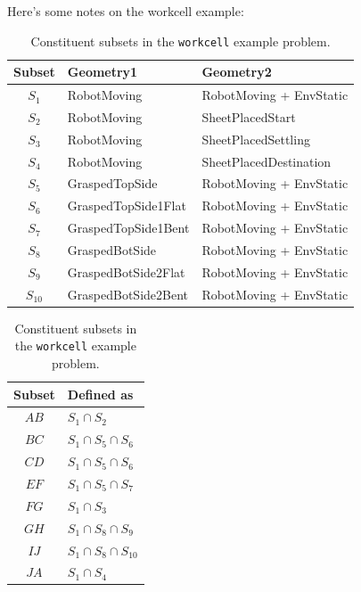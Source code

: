 Here's some notes on the workcell example:

\begin{table}
   \centering
   \begin{minipage}[t]{.65\textwidth}
   \begin{tabular}{cll}
      \toprule
      Subset & Geometry1 & Geometry2 \\
      \midrule
      $S_1$  & RobotMoving & RobotMoving + EnvStatic \\
      $S_2$  & RobotMoving & SheetPlacedStart \\
      $S_3$  & RobotMoving & SheetPlacedSettling \\
      $S_4$  & RobotMoving & SheetPlacedDestination \\
      $S_5$  & GraspedTopSide & RobotMoving + EnvStatic \\
      $S_6$  & GraspedTopSide1Flat & RobotMoving + EnvStatic \\
      $S_7$  & GraspedTopSide1Bent & RobotMoving + EnvStatic \\
      $S_8$  & GraspedBotSide & RobotMoving + EnvStatic \\
      $S_9$  & GraspedBotSide2Flat & RobotMoving + EnvStatic \\
      $S_{10}$ & GraspedBotSide2Bent & RobotMoving + EnvStatic \\
      \bottomrule
   \end{tabular}
   \end{minipage}
   \begin{minipage}[t]{.30\textwidth}
   \begin{tabular}{cl}
      \toprule
      Subset & Defined as \\
      \midrule
      $AB$  & $S_1 \cap S_2$ \\
      $BC$  & $S_1 \cap S_5 \cap S_6$ \\
      $CD$  & $S_1 \cap S_5 \cap S_6$ \\
      $EF$  & $S_1 \cap S_5 \cap S_7$ \\
      $FG$  & $S_1 \cap S_3$ \\
      $GH$  & $S_1 \cap S_8 \cap S_9$ \\
      $IJ$  & $S_1 \cap S_8 \cap S_{10}$ \\
      $JA$  & $S_1 \cap S_4$ \\
      \bottomrule
   \end{tabular}
   \end{minipage}
   \caption{Constituent subsets in the \texttt{workcell} example
      problem.}
\end{table}

